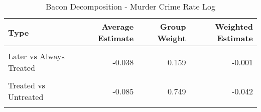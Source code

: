 \begin{table}[H]

\caption{\label{tab:tab:bacondecompositionMurder}Bacon Decomposition - Murder Crime Rate Log}
\centering
\begin{tabular}[t]{lrrr}
\toprule
Type & Average Estimate & Group Weight & Weighted Estimate\\
\midrule
\cellcolor{gray!6}{Earlier vs Later Treated} & \cellcolor{gray!6}{0.055} & \cellcolor{gray!6}{0.068} & \cellcolor{gray!6}{0.005}\\
Later vs Always Treated & -0.038 & 0.159 & -0.001\\
\cellcolor{gray!6}{Later vs Earlier Treated} & \cellcolor{gray!6}{0.019} & \cellcolor{gray!6}{0.023} & \cellcolor{gray!6}{0.000}\\
Treated vs Untreated & -0.085 & 0.749 & -0.042\\
\cellcolor{gray!6}{Total TWFE} & \cellcolor{gray!6}{NaN} & \cellcolor{gray!6}{NaN} & \cellcolor{gray!6}{-0.037}\\
\bottomrule
\end{tabular}
\end{table}
